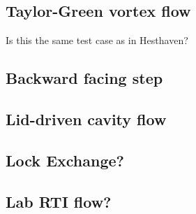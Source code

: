 \subsection{Taylor-Green vortex flow}
Is this the same test case as in Hesthaven?

\subsection{Backward facing step}

\subsection{Lid-driven cavity flow}

\subsection{Lock Exchange?}
\subsection{Lab RTI flow?}

